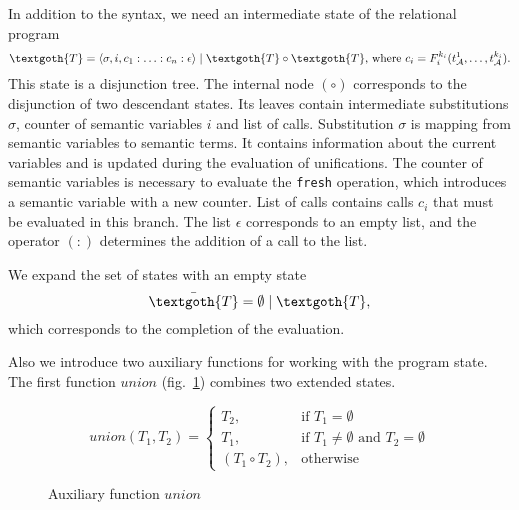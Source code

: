 
In addition to the syntax, we need an intermediate state of the relational program
\[
\textgoth{T} = \inbr{\sigma, i, c_1 : \ldots : c_n : \epsilon} \mid \textgoth{T} \circ \textgoth{T} \mbox{, where } c_i = F_i^{k_i}(t_\mathcal{A}^1, \ldots, t_\mathcal{A}^{k_i}).
\]
This state is a disjunction tree. The internal node $(\circ)$ corresponds to the disjunction of two descendant states.
Its leaves contain intermediate substitutions $\sigma$, counter of semantic variables $i$ and list of calls. 
Substitution $\sigma$ is mapping from semantic variables to semantic terms. 
It contains information about the current variables and is updated during the evaluation of unifications. 
The counter of semantic variables is necessary to evaluate the \lstinline{fresh} operation, which introduces a semantic variable with a new counter.
List of calls contains calls $c_i$ that must be evaluated in this branch.
The list $\epsilon$ corresponds to an empty list, and the operator $(:)$ determines the addition of a call to the list.


We expand the set of states with an empty state
\[
\bar{\textgoth{T}} = \emptyset \mid \textgoth{T},
\]
which corresponds to the completion of the evaluation.

Also we introduce two auxiliary functions for working with the program state. The first function $union$ (fig.~\ref{fair:union-semantics}) combines two extended states.

\begin{figure}[h!]
\[
union(T_1, T_2) =
\left\{
\begin{array}{rl}
T_2, & \mbox{if } T_1 = \emptyset \\
T_1, & \mbox{if } T_1 \not= \emptyset \mbox{ and } T_2 = \emptyset \\
(T_1 \circ T_2), & \mbox{otherwise}
\end{array}
\right.
\]
\caption{Auxiliary function $union$}
\label{fair:union-semantics}
\end{figure}

